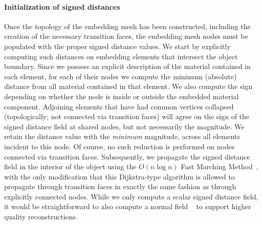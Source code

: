 \paragraph{Initialization of signed distances} Once the topology of
the embedding mesh has been constructed, including the creation of the
necessary transition faces, the embedding mesh nodes must be populated
with the proper signed distance values. We start by explicitly
computing such distances on embedding elements that intersect the
object boundary. Since we possess an explicit description of the
material contained in each element, for each of their nodes we compute
the minimum (absolute) distance from all material contained in that
element. We also compute the sign depending on whether the node is
inside or outside the embedded material component. Adjoining elements
that have had common vertices collapsed (topologically; not connected
via transition faces) will agree on the sign of the signed distance
field at shared nodes, but not necessarily the magnitude. We retain
the distance value with the \emph{minimum} magnitude, across all
elements incident to this node. Of course, no such reduction is
performed on nodes connected via transition faces. Subsequently, we
propagate the signed distance field in the interior of the object
using the $O(n\log n)$ Fast Marching Method~\citep{Sethi:1998}, with
the only modification that this Dijkstra-type algorithm is allowed to
propagate through transition faces in exactly the same fashion as
through explicitly connected nodes.  While we only compute a scalar
signed distance field, it would be straightforward to also compute a
normal field ~\citep{KobbeBSS:2001} to support higher quality
reconstructions.

